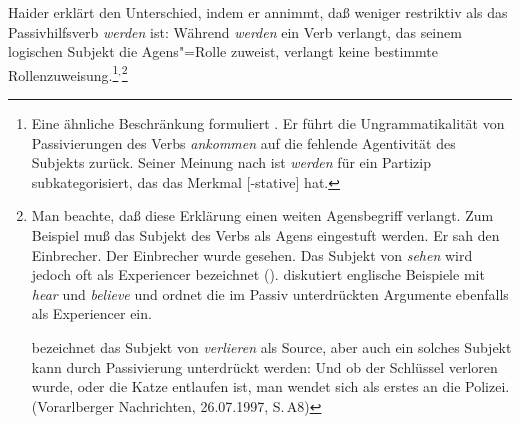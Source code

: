 %
Haider erklärt den Unterschied, indem er annimmt, daß \sein 
weniger restriktiv als das Passivhilfsverb \emph{werden} ist: Während \emph{werden} ein
Verb verlangt, das seinem logischen Subjekt die Agens"=Rolle
zuweist, verlangt \sein keine bestimmte Rollenzuweisung.\footnote{
        Eine ähnliche Beschränkung formuliert \citet[, ]{Toman86a}. Er führt
        die Ungrammatikalität von Passivierungen des Verbs \emph{ankommen} auf
        die fehlende Agentivität des Subjekts zurück. Seiner Meinung nach ist 
        \emph{werden} für ein Partizip subkategorisiert, das das Merkmal [-stative] hat.%
}$^,$\footnote{
        Man beachte, daß diese Erklärung einen weiten Agensbegriff verlangt. Zum Beispiel
        muß das Subjekt des Verbs  als Agens eingestuft werden.
        \eal
        \ex Er sah den Einbrecher.
        \ex Der Einbrecher wurde gesehen.
        \zl
        Das Subjekt von \emph{sehen} wird jedoch oft als Experiencer bezeichnet (\zb \citealp[]{Devlin92}). \citet[]{Dowty2000a} diskutiert englische
        Beispiele mit \emph{hear} und \emph{believe} und ordnet die im Passiv unterdrückten
        Argumente ebenfalls als Experiencer ein.%


\citet[]{Abraham2005a} bezeichnet das Subjekt von \emph{verlieren} als Source, aber auch ein
solches Subjekt kann durch Passivierung unterdrückt werden:
\ea
Und ob der Schlüssel verloren wurde, oder die Katze entlaufen ist, man wendet sich als erstes an die Polizei.
(Vorarlberger Nachrichten, 26.07.1997, S.\,A8)
\z

}
